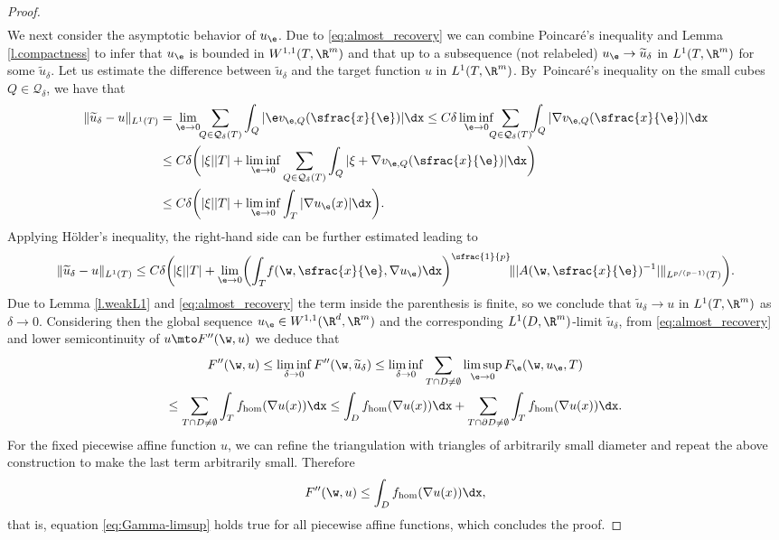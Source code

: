 \begin{proof}
\begin{multline}
\end{multline}
We next consider the asymptotic behavior of $u_{\e}$. Due to \eqref{eq:almost_recovery} we can combine Poincaré's inequality and Lemma \ref{l.compactness} to infer that $u_{\e}$ is bounded in $W^{1,1}(T,\R^m)$ and that up to a subsequence (not relabeled) $u_{\e}\to \widetilde{u}_{\delta}$ in $L^1(T,\R^m)$ for some $\widetilde{u}_{\delta}$. Let us estimate the difference between $\widetilde{u}_{\delta}$ and the target function $u$ in $L^1(T,\R^m)$. By~Poincaré's inequality on the small cubes $Q\in\mathcal{Q}_{\delta}$, we have that
\begin{align*}
\|\widetilde{u}_{\delta}-u\|_{L^1(T)}&=\lim_{\e\to 0}\hspace*{-1mm}\sum_{Q\in\mathcal{Q}_{\delta}(T)} \int_Q|\e v_{\e,Q}(\sfrac{x}{\e})|\dx\leq C\delta\liminf_{\e\to 0}\hspace*{-2mm}\sum_{Q\in\mathcal{Q}_{\delta}(T)}\hspace*{-1mm}\int_{Q}|\nabla v_{\e,Q}(\sfrac{x}{\e})|\dx
\\
&\leq C\delta \biggl(|\xi||T|+\liminf_{\e\to 0}\sum_{Q\in\mathcal{Q}_{\delta}(T)}\int_{Q}|\xi+\nabla v_{\e,Q}(\sfrac{x}{\e})|\dx\biggr)
\\
&\leq C\delta \biggl(|\xi||T|+\liminf_{\e\to 0}\int_{T}|\nabla u_{\e}(x)|\dx\biggr).
\end{align*}
Applying Hölder's inequality, the right-hand side can be further estimated leading to
\begin{equation*}
\|\widetilde{u}_{\delta}-u\|_{L^1(T)}\leq C\delta\biggl(\!|\xi||T|+\lim_{\e\to 0}\biggl(\int_{T}\!f(\w,\sfrac{x}{\e},\nabla u_{\e})\dx\biggr)^{\sfrac{1}{p}}\!\||A(\w,\sfrac{x}{\e})^{-1}|\|_{L^{p/(p-1)}(T)}\biggr).
\end{equation*}
Due to Lemma \ref{l.weakL1} and \eqref{eq:almost_recovery} the term inside the parenthesis is finite, so we conclude that $\widetilde{u}_{\delta}\to u$ in $L^1(T,\R^m)$ as $\delta\to 0$. Considering then the global sequence $u_{\e}\in W^{1,1}(\R^d,\R^m)$ and the corresponding $L^1(D,\R^m)$-limit $\widetilde{u}_{\delta}$, from \eqref{eq:almost_recovery} and lower semicontinuity of $u\mto F''(\w,u)$ we deduce that
\begin{multline*}
F''(\w,u)\leq\liminf_{\delta\to 0}F''(\w,\widetilde{u}_{\delta})\leq\liminf_{\delta\to 0} \sum_{T\cap D\neq\emptyset}\limsup_{\e\to 0}F_{\e}(\w,u_{\e},T)
\\
\leq  \sum_{T\cap D\neq\emptyset}\int_Tf_{\hom}(\nabla u(x))\dx
\leq \int_D f_{\hom}(\nabla u(x))\dx+\sum_{T\cap\partial D\neq\emptyset}\int_Tf_{\hom}(\nabla u(x))\dx.
\end{multline*}
For the fixed piecewise affine function $u$, we can refine the triangulation with triangles of arbitrarily small diameter and repeat the above construction to make the last term arbitrarily small. Therefore
\begin{equation*}
F''(\w,u)\leq \int_{D}f_{\hom}(\nabla u(x))\dx,
\end{equation*}
that is, equation \eqref{eq:Gamma-limsup} holds true for all piecewise affine functions, which concludes the proof.
\end{proof}

